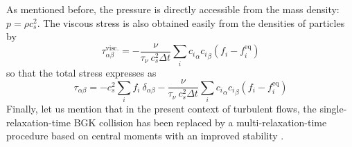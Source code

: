 \documentclass[pre,aps,floatfix,10pt,superscriptaddress, notitlepage,preprint]{revtex4-1}
\begin{document}
As mentioned before, the pressure is directly accessible from the mass density: $p = \rho c_s^2$. The viscous stress is also obtained easily from the densities of particles by
\[
\tau^\mathrm{visc.}_{\alpha \beta} = -\frac{\nu}{\tau_\nu ~ c_s^2 \Delta t} \sum_i  {c_i}_\alpha {c_i}_\beta (f_i - f_i^\mathrm{eq})
\]
so that the total stress expresses as
\begin{equation}\label{eq:def_stress}
\tau_{\alpha \beta} = -  c_s^2 \sum_i f_i ~ \delta_{\alpha\beta}  - \frac{\nu}{\tau_\nu ~ c_s^2 \Delta t} \sum_i  {c_i}_\alpha {c_i}_\beta (f_i - f_i^\mathrm{eq})
\end{equation}
Finally, let us mention that in the present context of turbulent flows, the single-relaxation-time BGK collision has been replaced by a multi-relaxation-time procedure based on central moments with an improved stability \cite{De_Rosis_2016}.



\end{document}
